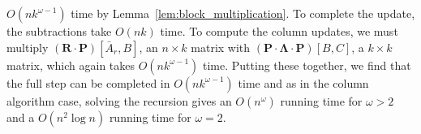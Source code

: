 \documentclass{article}
\newcommand{\matsize}[2]{#1\times #2}
\newcommand{\matexp}{\omega}
\newcommand{\mat}[1]{\mathbf{#1}}
\newcommand{\Remark}[1]{\textcolor{blue}{[#1]}}
\begin{document}
$O(nk^{\matexp-1})$ time by Lemma~\ref{lem:block_multiplication}. To complete the update, the subtractions take $O(nk)$ time. %
To compute the column updates, 
we must multiply $(\mat{R}\cdot\mat{P})[\bar{A}_r,B]$, an $\matsize{n}{k}$ matrix with  $(\mat{P} \cdot \mat{\Lambda} \cdot \mat{P})[B,C]$, a $\matsize{k}{k}$ matrix, which again takes $O(nk^{\matexp-1})$ time. 
%
Putting these together, we find that the full step can be completed in  $O(nk^{\matexp-1})$ time and as in the column algorithm case, solving the recursion  gives an  $O(n^{\matexp})$ running time for $\matexp>2$ and  a  $O(n^2\log n )$ running time for $\matexp=2$. %


\end{document}
